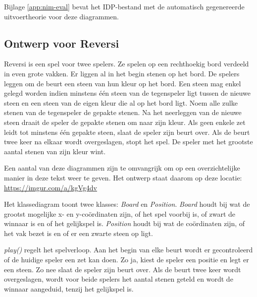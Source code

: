 Bijlage \ref{app:nim-eval} bevat het IDP-bestand met de automatisch gegenereerde uitvoertheorie voor deze diagrammen.


\subsection{Ontwerp voor Reversi}

Reversi is een spel voor twee spelers. Ze spelen op een rechthoekig bord verdeeld in even grote vakken. Er liggen al in het begin stenen op het bord. De spelers leggen om de beurt een steen van hun kleur op het bord. Een steen mag enkel gelegd worden indien minstens \'e\'en steen van de tegenspeler ligt tussen de nieuwe steen en een steen van de eigen kleur die al op het bord ligt. Noem alle zulke stenen van de tegenspeler de gepakte stenen. Na het neerleggen van de nieuwe steen draait de speler de gepakte stenen om naar zijn kleur. Als geen enkele zet leidt tot minstens \'e\'en gepakte steen, slaat de speler zijn beurt over. Als de beurt twee keer na elkaar wordt overgeslagen, stopt het spel. De speler met het grootste aantal stenen van zijn kleur wint.

Een aantal van deze diagrammen zijn te omvangrijk om op een overzichtelijke manier in deze tekst weer te geven. Het ontwerp staat daarom op deze locatie: \url{https://imgur.com/a/kgVg4dv}

Het klassediagram toont twee klasses: \textit{Board} en \textit{Position}. \textit{Board} houdt bij wat de grootst mogelijke x- en y-co\"ordinaten zijn, of het spel voorbij is, of zwart de winnaar is en of het gelijkspel is. \textit{Position} houdt bij wat de co\"ordinaten zijn, of het vak bezet is en of er een zwarte steen op ligt.

\textit{play()} regelt het spelverloop. Aan het begin van elke beurt wordt er gecontroleerd of de huidige speler een zet kan doen. Zo ja, kiest de speler een positie en legt er een steen. Zo nee slaat de speler zijn beurt over. Als de beurt twee keer wordt overgeslagen, wordt voor beide spelers het aantal stenen geteld en wordt de winnaar aangeduid, tenzij het gelijkspel is.

